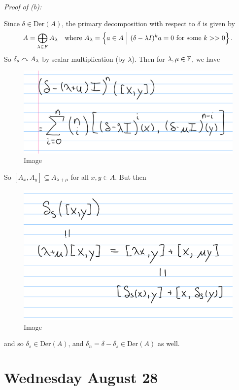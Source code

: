 \emph{Proof of (b):}

Since \(\delta \in \mathrm{Der}(A)\), the primary decomposition with
respect to \(\delta\) is given by \[
A = \bigoplus_{\lambda \in F} A_\lambda \quad \text{where} ~A_\lambda = \left\{{a\in A {~\mathrel{\Big|}~} (\delta - \lambda I)^k a = 0 ~\text{for some}~ k >> 0}\right\}.
\] So \(\delta_s \curvearrowright A_\lambda\) by scalar multiplication (by
\(\lambda\)). Then for \(\lambda, \mu \in {\mathbb{F}}\), we have

\begin{figure}
\centering
\includegraphics{figures/2019-08-28-09:54.png}
\caption{Image}
\end{figure}

So \([A_x, A_y] \subseteq A_{\lambda + \mu}\) for all \(x, y \in A\).
But then

\begin{figure}
\centering
\includegraphics{figures/2019-08-28-09:56.png}
\caption{Image}
\end{figure}

and so \(\delta_s \in \mathrm{Der}(A)\), and
\(\delta_n = \delta - \delta_s \in \mathrm{Der}(A)\) as well.

\hypertarget{wednesday-august-28}{%
\section{Wednesday August 28}\label{wednesday-august-28}}

